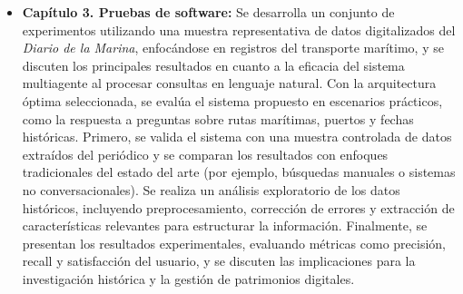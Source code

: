 \begin{itemize}
	\item \textbf{Capítulo 3. Pruebas de software:} Se desarrolla un conjunto de experimentos utilizando una muestra representativa de datos digitalizados del \textit{Diario de la Marina}, enfocándose en registros del transporte marítimo, y se discuten los principales resultados en cuanto a la eficacia del sistema multiagente al procesar consultas en lenguaje natural. Con la arquitectura óptima seleccionada, se evalúa el sistema propuesto en escenarios prácticos, como la respuesta a preguntas sobre rutas marítimas, puertos y fechas históricas. Primero, se valida el sistema con una muestra controlada de datos extraídos del periódico y se comparan los resultados con enfoques tradicionales del estado del arte (por ejemplo, búsquedas manuales o sistemas no conversacionales). Se realiza un análisis exploratorio de los datos históricos, incluyendo preprocesamiento, corrección de errores y extracción de características relevantes para estructurar la información. Finalmente, se presentan los resultados experimentales, evaluando métricas como precisión, recall y satisfacción del usuario, y se discuten las implicaciones para la investigación histórica y la gestión de patrimonios digitales.
\end{itemize}


	











